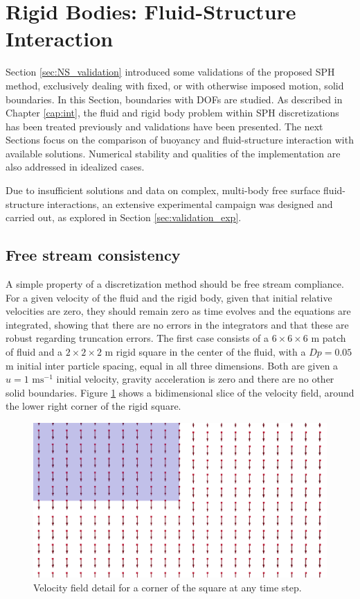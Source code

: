 \section{Rigid Bodies: Fluid-Structure Interaction}
\label{sec:FB_validation}

Section \ref{sec:NS_validation} introduced some validations of the proposed \ac{SPH} method, exclusively dealing with fixed, or with otherwise imposed motion, solid boundaries. In this Section, boundaries with \ac{DOF}s are studied. As described in Chapter \ref{cap:int}, the fluid and rigid body problem within \ac{SPH} discretizations has been treated previously and validations have been presented. The next Sections focus on the comparison of buoyancy and fluid-structure interaction with available solutions. Numerical stability and qualities of the implementation are also addressed in idealized cases.

Due to insufficient solutions and data on complex, multi-body free surface fluid-structure interactions, an extensive experimental campaign was designed and carried out, as explored in Section \ref{sec:validation_exp}.


\subsection{Free stream consistency}
\label{Subsect:free_stream}
%
A simple property of a discretization method should be free stream compliance. For a given velocity of the fluid and the rigid body, given that initial relative velocities are zero, they should remain zero as time evolves and the equations are integrated, showing that there are no errors in the integrators and that these are robust regarding truncation errors. The first case consists of a $6 \times 6 \times 6$ m patch of fluid and a $2 \times 2 \times 2$ m rigid square in the center of the fluid, with a $Dp=0.05$ m initial inter particle spacing, equal in all three dimensions. Both are given a $u=1\text{ ms}^{-1}$ initial velocity, gravity acceleration is zero and there are no other solid boundaries. Figure \ref{fig:Free_stream_C1} shows a bidimensional slice of the velocity field, around the lower right corner of the rigid square.
%
\begin{figure}[ht!]
	\centering
	\includegraphics[width=0.5\linewidth]{Figures/5.Chapter/fig1}
	\caption{Velocity field detail for a corner of the square at any time step.}
	\label{fig:Free_stream_C1} 
\end{figure}
%

